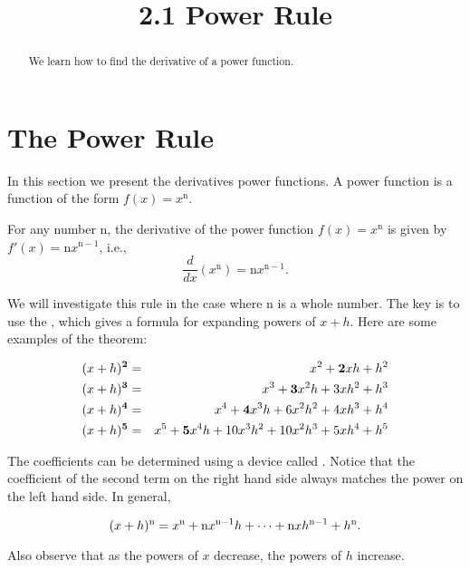 \documentclass[handout]{ximera}
\title{2.1 Power Rule}
\begin{document}
\begin{abstract}
We learn how to find the derivative of a power function.
\end{abstract}

\maketitle


\section{The Power Rule}

In this section we present the derivatives power functions. A power function is a function of the form $f(x) = x^\text{n}$.  

\begin{theorem}
For any number n, the derivative of the power function $f(x) = x^\text{n}$ is given by
$f'(x) = \text{n}x^{\text{n} -1}$, i.e.,
\[\frac{d}{dx} \left(x^\text{n}\right) = \text{n}x^{\text{n}-1}.\]
\end{theorem}

We will investigate this rule in the case where n is a whole number. The key is to use 
the , which gives a formula for 
expanding powers of $x+h$. 
Here are some examples of the theorem:

\begin{eqnarray*}
(x+h)^{\bf 2} &=&x^2 + {\bf 2}xh + h^2\\
(x+h)^{\bf 3} &=& x^3 + {\bf 3}x^2h + 3xh^2 + h^3\\
(x+h)^{\bf 4} &=& x^4 + {\bf 4}x^3h+ 6x^2h^2 + 4xh^3 + h^4\\
(x+h)^{\bf 5} &=& x^5 + {\bf 5}x^4h + 10x^3h^2 + 10x^2h^3 + 5xh^4 + h^5
\end{eqnarray*}

The coefficients can be  determined using a device called .
Notice that the coefficient of the second term on the right hand side always matches the power on the left hand side. In general,

\[(x+h)^{\bf \text{n}} = x^\text{n} + {\bf \text{n}}x^{\text{n}-1}h + \dots + \text{n}xh^{\text{n}-1} + h^\text{n}.\]

Also observe that as the powers of $x$ decrease, the powers of $h$ increase.\\
\end{document}
